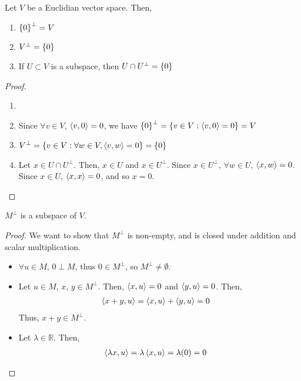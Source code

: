 \documentclass[letterpaper,12pt]{article}
\begin{document}
\begin{corollary}
Let $V$ be a Euclidian vector space. Then,
\begin{enumerate}
    \item $\left\{ 0 \right\}^{\perp} = V$
    \item $V^{\perp} = \left\{ 0 \right\}$
    \item If $U \subset V$ is a subspace, then $U \cap U^{\perp} = \left\{ 0 \right\}$
\end{enumerate}
\end{corollary}
\begin{proof}
\begin{enumerate}
    \item[]
    \item Since $\forall v \in V$, $\left< v, 0 \right> = 0$, we have $\left\{ 0 \right\}^{\perp} = \left\{ v \in V: \left< v, 0 \right> = 0 \right\} = V$
    \item $V^{\perp} = \left\{ v \in V: \forall w \in V, \left< v, w \right> = 0 \right\} = \left\{ 0 \right\}$
    \item Let $x \in U \cap U^{\perp}$. Then, $x \in U$ and $x \in U^{\perp}$. Since $x \in U^{\perp}$, $\forall w \in U$, $\left< x, w \right> = 0$. Since $x \in U$, $\left< x, x \right> = 0$, and so $x = 0$.
\end{enumerate}
\end{proof}

\begin{corollary}

\end{corollary}

\begin{corollary}
$M^{\perp}$ is a subspace of $V$.
\end{corollary}
\begin{proof}
We want to show that $M^{\perp}$ is non-empty, and is closed under addition and scalar multiplication.
\begin{itemize}
    \item $\forall u \in M$, $0 \perp M$, thus $0 \in M^{\perp}$, so $M^{\perp} \neq \emptyset$.
    \item Let $u \in M$, $x$, $y \in M^{\perp}$. Then, $\left< x, u \right> = 0$ and $\left< y, u \right> = 0$. Then,
    \begin{align*}
        \left< x+y, u \right> & = \left< x, u \right> + \left< y, u \right> = 0
    \end{align*}
    Thus, $x + y \in M^{\perp}$.
    \item Let $\lambda \in \mathbb{R}$. Then,
    \begin{align*}
        \left< \lambda x, u \right> & = \lambda \left< x, u \right> = \lambda (0) = 0
    \end{align*}
\end{itemize}
\end{proof}
\end{document}
